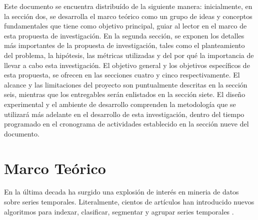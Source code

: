 Este documento se encuentra distribu\'ido de la siguiente manera: inicialmente, en la secci\'on dos, se desarrolla el marco te\'orico como un grupo de ideas y conceptos fundamentales que tiene como objetivo principal, guiar al lector en el marco de esta propuesta de investigaci\'on. En la segunda secci\'on, se exponen los detalles m\'as importantes de la propuesta de investigaci\'on, tales como el planteamiento del problema, la hip\'otesis, las m\'etricas utilizadas y del por qu\'e la importancia de llevar a cabo esta investigaci\'on. El objetivo general y los objetivos espec\'ificos de esta propuesta, se ofrecen en las secciones cuatro y cinco respectivamente. El alcance y las limitaciones del proyecto son puntualmente descritas en la secci\'on seis, mientras que los entregables ser\'an enlistados en la secci\'on siete. El dise\~no experimental y el ambiente de desarrollo comprenden la metodolog\'ia que se utilizar\'a m\'as adelante en el desarrollo de esta investigaci\'on, dentro del tiempo programado en el cronograma de actividades establecido en la secci\'on nueve del documento.
\section{\textbf{Marco Te\'orico}}
En la \'ultima decada ha surgido una explosi\'on de inter\'es en mineria de datos sobre series temporales. Literalmente, cientos de art\'iculos han introducido nuevos algoritmos para indexar, clasificar, segmentar y agrupar series temporales \cite{sigmod}. 
